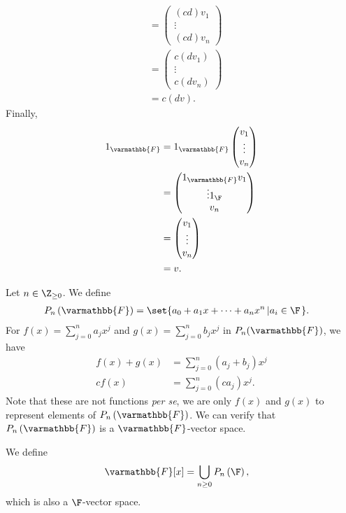 \documentclass[10pt]{mypackage}
\renewcommand*{\mathbb}[1]{\varmathbb{#1}}
\begin{document}
\begin{example}[$\F^{n}$]
\begin{align*}
          &= \begin{pmatrix}(cd)v_1 \\\vdots\\(cd)v_n\end{pmatrix}\\
          &= \begin{pmatrix}c\left(dv_1\right) \\\vdots\\c\left(dv_n\right)\end{pmatrix}\\
          &= c\left(dv\right).
  \end{align*}
  Finally,
  \begin{align*}
    1_{\mathbb{F}} &= 1_{\mathbb{F}} \begin{pmatrix}v_1\\\vdots\\v_n\end{pmatrix}\\
                   &= \begin{pmatrix}1_{\mathbb{F}}v_1\\\vdots 1_{\F}\\v_n\end{pmatrix}\\
                   &= \begin{pmatrix}v_1\\\vdots\\v_n\end{pmatrix}\\
                   &= v.
  \end{align*}
\end{example}
\begin{example}[Polynomials]
  Let $n\in \Z_{\geq 0}$. We define
  \begin{align*}
    P_{n}\left(\mathbb{F}\right) &= \set{a_0 + a_1x + \cdots + a_nx^n\left|a_i\in \F\right.}.
  \end{align*}
  For $f(x) = \sum_{j=0}^{n}a_jx^j$ and $g(x) = \sum_{j=0}^{n}b_jx^j$ in $P_n(\mathbb{F})$, we have
  \begin{align*}
    f(x) + g(x) &= \sum_{j=0}^{n}\left(a_j + b_j\right)x^j\\
    cf(x) &= \sum_{j=0}^{n}\left(ca_j\right)x^j.
  \end{align*}
  Note that these are not functions \textit{per se}, we are only $f(x)$ and $g(x)$ to represent elements of $P_n\left(\mathbb{F}\right)$. We can verify that $P_n\left(\mathbb{F}\right)$ is a $\mathbb{F}$-vector space.\newline

  We define
  \begin{align*}
    \mathbb{F}[x] &= \bigcup_{n\geq 0}P_n\left(\F\right),
  \end{align*}
  which is also a $\F$-vector space.
\end{example}
\end{document}
